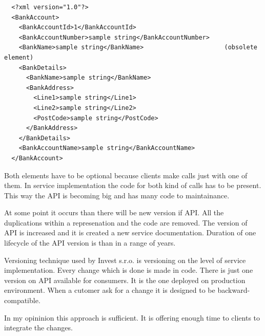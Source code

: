 \begin{lstlisting}
  <?xml version="1.0"?>
  <BankAccount>
    <BankAccountId>1</BankAccountId>
    <BankAccountNumber>sample string</BankAccountNumber>
    <BankName>sample string</BankName>                      (obsolete element)
    <BankDetails>
      <BankName>sample string</BankName>
      <BankAddress>
        <Line1>sample string</Line1>
        <Line2>sample string</Line2>
        <PostCode>sample string</PostCode>
      </BankAddress>
    </BankDetails>
    <BankAccountName>sample string</BankAccountName>
  </BankAccount>
\end{lstlisting}

Both elements have to be optional because clients make calls just with one of them. In service implementation the code for both kind of calls has to be present. This way the API is becoming big and has many code to maintainance. 

At some point it occurs than there will be new version if API. All the duplications within a represenation and the code are removed. The version of API is increased and it is created a new service documentation. Duration of one lifecycle of the API version is than in a range of years. 


Versioning technique used by Invest s.r.o. is versioning on the level of service implementation. Every change which is done is made in code. There is just one version on API available for consumers. It is the one deployed on production environment. When a cutomer ask for a change it is designed to be backward-compatible.

In my opininion this approach is sufficient. It is offering enough time to clients to integrate the changes. 










